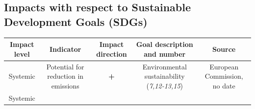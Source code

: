 \documentclass[
]{book}
\begin{document}
\hypertarget{impacts-with-respect-to-sustainable-development-goals-sdgs-19}{%
\subsection*{Impacts with respect to Sustainable Development Goals (SDGs)}\label{impacts-with-respect-to-sustainable-development-goals-sdgs-19}}

\begin{longtable}[]{@{}ccccc@{}}
\toprule
\begin{minipage}[b]{0.17\columnwidth}\centering
Impact level\strut
\end{minipage} & \begin{minipage}[b]{0.16\columnwidth}\centering
Indicator\strut
\end{minipage} & \begin{minipage}[b]{0.17\columnwidth}\centering
Impact direction\strut
\end{minipage} & \begin{minipage}[b]{0.17\columnwidth}\centering
Goal description and number\strut
\end{minipage} & \begin{minipage}[b]{0.17\columnwidth}\centering
Source\strut
\end{minipage}\tabularnewline
\midrule
\endhead
\begin{minipage}[t]{0.17\columnwidth}\centering
Systemic\strut
\end{minipage} & \begin{minipage}[t]{0.16\columnwidth}\centering
Potential for reduction in emissions\strut
\end{minipage} & \begin{minipage}[t]{0.17\columnwidth}\centering
\textbf{+}\strut
\end{minipage} & \begin{minipage}[t]{0.17\columnwidth}\centering
Environmental sustainability (\emph{7,12-13,15})\strut
\end{minipage} & \begin{minipage}[t]{0.17\columnwidth}\centering
European Commission, no date\strut
\end{minipage}\tabularnewline
\begin{minipage}[t]{0.17\columnwidth}\centering
Systemic\strut
\end{minipage} & \begin{minipage}[t]{0.16\columnwidth}\centering

\end{minipage}
\end{longtable}
\end{document}

